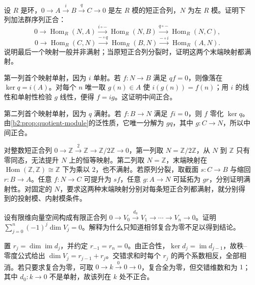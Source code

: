 \begin{optionalexercise}\label{b2:ex:03-hom-left-exact}
	设 \(R\) 是环，\(0\to A\xrightarrow{i}B\xrightarrow{q}C\to0\) 是左 \(R\) 模的短正合列，\(N\) 为左 \(R\) 模。证明下列加法群序列正合：
	\[
		0\longrightarrow\operatorname{Hom}_R(N,A)\xrightarrow{i\circ-} \operatorname{Hom}_R(N,B)\xrightarrow{q\circ-}\operatorname{Hom}_R(N,C),
	\]
	\[
		0\longrightarrow\operatorname{Hom}_R(C,N)\xrightarrow{-\circ q} \operatorname{Hom}_R(B,N)\xrightarrow{-\circ i}\operatorname{Hom}_R(A,N).
	\]
	说明最后一个映射一般并非满射；当原短正合列分裂时，证明这两个末端映射都满射。
\end{optionalexercise}
\begin{solution}
	第一列首个映射单射，因为 \(i\) 单射。若 \(f:N\to B\) 满足 \(qf=0\)，则像落在 \(\ker q=i(A)\)。对每个 \(n\) 唯一取 \(g(n)\in A\) 使 \(i(g(n))=f(n)\)；用 \(i\) 的线性和单射性检验 \(g\) 线性，便得 \(f=ig\)。这证明中间正合。

	第二列首个映射单射，因为 \(q\) 满射。若 \(f:B\to N\) 满足 \(fi=0\)，则 \(f\) 零化 \(\ker q\)。由\cref{b2:prop:quotient-module}的泛性质，它唯一分解为 \(gq\)，其中 \(g:C\to N\)，所以中间正合。

	对整数短正合列 \(0\to\mathbb Z\xrightarrow{2}\mathbb Z\to\mathbb Z/2\mathbb Z\to0\)，第一列取 \(N=\mathbb Z/2\mathbb Z\)，从 \(N\) 到 \(\mathbb Z\) 只有零同态，无法提升 \(N\) 上的恒等映射。第二列取 \(N=\mathbb Z\)，末端映射在 \(\operatorname{Hom}(\mathbb Z,\mathbb Z)\cong\mathbb Z\) 下为乘以 \(2\)，也不满射。若原列分裂，取截面 \(s:C\to B\) 与缩回 \(r:B\to A\)。任意 \(f:N\to C\) 可提升为 \(sf\)，任意 \(g:A\to N\) 可延拓为 \(gr\)，分别证明满射性。对固定的 \(N\)，要求这两种末端映射分别对每条短正合列都满射，就分别得到的投射模、内射模条件。
\end{solution}

\begin{exercise}\label{b2:ex:03-exact-dimension-sum}
	设有限维向量空间构成有限正合列 \(0\to V_0\xrightarrow{d_0}V_1\to\cdots\to V_n\to0\)。证明 \(\sum_{j=0}^n(-1)^j\dim V_j=0\)。解释为什么只知道相邻复合为零不足以得到结论。
\end{exercise}
\begin{solution}
	置 \(r_j=\dim\operatorname{im}d_j\)，并约定 \(r_{-1}=r_n=0\)。由正合性，\(\ker d_j=\operatorname{im}d_{j-1}\)，故秩--零度公式给出 \(\dim V_j=r_{j-1}+r_j\)。交错求和时每个 \(r_j\) 的两个系数相反，全部相消。若只要求复合为零，可取 \(0\to k\xrightarrow{0}0\to0\)，复合全为零，但交错维数和为 \(1\)；其中 \(d_0:k\to0\) 不是单射，故该列在 \(k\) 处不正合。
\end{solution}

